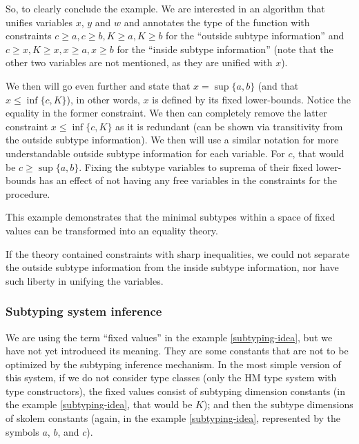 So, to clearly conclude the example. We are interested in an algorithm that unifies variables $x$, $y$ and $w$ and annotates the type of the function with constraints $c \geq a, c \geq b, K \geq a, K \geq b$ for the ``outside subtype information'' and $c \geq x, K \geq x, x \geq a, x \geq b$ for the ``inside subtype information'' (note that the other two variables are not mentioned, as they are unified with $x$).

We then will go even further and state that $x = \sup \{a, b\}$ (and that $x \leq \inf \{c, K\}$), in other words, $x$ is defined by its fixed lower-bounds. Notice the equality in the former constraint. We then can completely remove the latter constraint $x \leq \inf \{c, K\}$ as it is redundant (can be shown via transitivity from the outside subtype information).  We then will use a similar notation for more understandable outside subtype information for each variable. For $c$, that would be $c \geq \sup \{a, b\}$. Fixing the subtype variables to suprema of their fixed lower-bounds has an effect of not having any free variables in the constraints for the procedure.

This example demonstrates that the minimal subtypes within a space of fixed values can be transformed into an equality theory.

\begin{remark}
    If the theory contained constraints with sharp inequalities, we could not separate the outside subtype information from the inside subtype information, nor have such liberty in unifying the variables.
\end{remark}

\subsubsection{Subtyping system inference}

We are using the term ``fixed values'' in the example \ref{subtyping-idea}, but we have not yet introduced its meaning. They are some constants that are not to be optimized by the subtyping inference mechanism. In the most simple version of this system, if we do not consider type classes (only the HM type system with type constructors), the fixed values consist of subtyping dimension constants (in the example \ref{subtyping-idea}, that would be $K$); and then the subtype dimensions of skolem constants (again, in the example \ref{subtyping-idea}, represented by the symbols $a$, $b$, and $c$).

